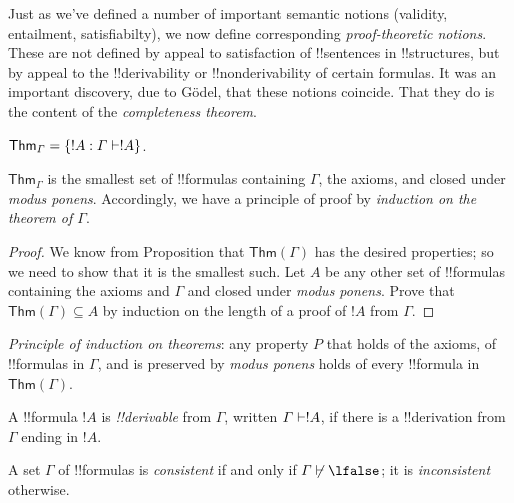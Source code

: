 \documentclass[../../include/open-logic-section]{subfiles}
\begin{document}

\begin{explain}
Just as we've defined a number of important semantic notions
(validity, entailment, satisfiabilty), we now define corresponding
\emph{proof-theoretic notions}.  These are not defined by appeal to
satisfaction of !!{sentence}s in !!{structure}s, but by appeal to the
!!{derivability} or !!{nonderivability} of certain formulas.  It was
an important discovery, due to G\"odel, that these notions coincide.
That they do is the content of the \emph{completeness theorem}.
\end{explain}

\begin{defn}[Theorems]
  $\mathsf{Thm}_\Gamma = \{ !A :  \Gamma \Proves !A\}$. 

 $\mathsf{Thm}_\Gamma$ is the smallest set of !!{formula}s containing
 $\Gamma$, the axioms, and closed under \emph{modus
   ponens}. Accordingly, we have a principle of proof by
 \emph{induction on the theorem of $\Gamma$}.  
\end{defn}

\begin{proof}
  We know from Proposition  that
  $\mathsf{Thm}(\Gamma)$ has the desired properties; so we need to
  show that it is the smallest such. Let $A$ be any other set of
  !!{formula}s containing the axioms and $\Gamma$ and closed under
  \emph{modus ponens}. Prove that $\mathsf{Thm}(\Gamma) \subseteq A$
  by induction on the length of a proof of $!A$ from $\Gamma$.
\end{proof}

\begin{cor}
  \emph{Principle of induction on theorems}: any property $P$ that
  holds of the axioms, of !!{formula}s in $\Gamma$, and is preserved by
  \emph{modus ponens} holds of every !!{formula} in
  $\mathsf{Thm}(\Gamma)$.
\end{cor}

\begin{defn}[!!^{derivability}]
 A !!{formula}
  $!A$ is \emph{{!!derivable}} from $\Gamma$, written $\Gamma \Proves
  !A$, if there is a !!{derivation} from $\Gamma$ ending in $!A$. 
\end{defn}

\begin{defn}[Consistency]
  A set $\Gamma$ of !!{formula}s is \emph{consistent} if and only if 
  $\Gamma\Proves/ \lfalse$; it is \emph{inconsistent} otherwise.
\end{defn}
\end{document}
